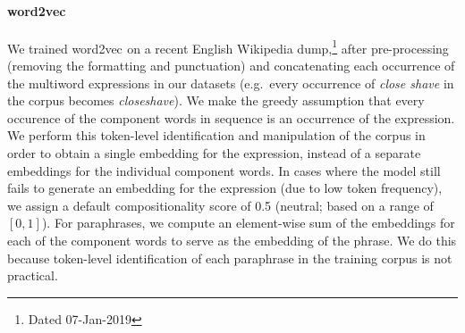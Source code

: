 \documentclass[11pt,a4paper]{article}
\newcommand{\embmethod}[2][]{\textsf{#2}$_{\text{#1}}$\xspace}
\newcommand{\wordtovec}{\embmethod{word2vec}}
\begin{document}
\paragraph{\wordtovec}
We trained \wordtovec \cite{Mikolov2013b} on a recent English Wikipedia dump,\footnote{\label{wiki}Dated 07-Jan-2019} after pre-processing (removing the formatting and punctuation) and concatenating each occurrence of the multiword expressions in our datasets (e.g.\ every occurrence of \textit{close shave} in the corpus becomes \textit{closeshave}). We make the greedy assumption that every occurence of the component words in sequence is an occurrence of the expression. We perform this token-level identification and manipulation of the corpus in order to obtain a single embedding for the expression, instead of a separate embeddings for the individual component words. In cases where the model still fails to generate an embedding for the expression (due to low token frequency), we assign a default compositionality score of 0.5 (neutral; based on a range of $[0,1]$). For paraphrases, we compute an element-wise sum of the embeddings for each of the component words to serve as the embedding of the phrase. We do this because token-level identification of each paraphrase in the training corpus is not practical.
\end{document}
